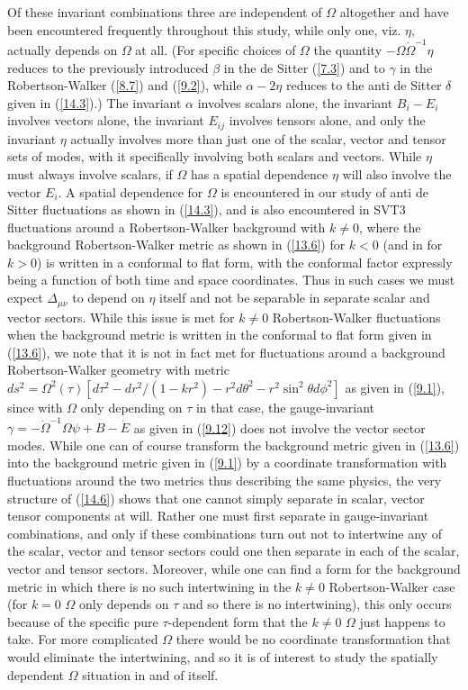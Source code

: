 \documentclass[aps,onecolumn,10pt]{revtex4}
\numberwithin{equation}{section}
\numberwithin{equation}{section}
\begin{document}
Of these invariant combinations three are independent of $\Omega$ altogether and have been encountered frequently throughout this study, while only one, viz. $\eta$, actually depends on $\Omega$ at all. (For specific choices of $\Omega$ the quantity $-\Omega\dot{\Omega}^{-1}\eta$ reduces to the previously introduced $\beta$ in the de Sitter (\ref{7.3}) and to $\gamma$ in the Robertson-Walker (\ref{8.7}) and (\ref{9.2}), while $\alpha-2\eta$ reduces to the anti de Sitter $\delta$ given in (\ref{14.3}).) The invariant $\alpha$ involves scalars alone, the invariant $B_i-E_i$ involves vectors alone, the invariant $E_{ij}$  involves tensors alone, and only the invariant $\eta$ actually involves more than just one of the scalar, vector and tensor sets of modes, with it specifically involving both scalars and vectors. While $\eta$ must always involve scalars, if $\Omega$ has a spatial dependence $\eta$ will also involve the vector $E_i$. A spatial dependence for $\Omega$ is  encountered in our study of anti de Sitter fluctuations as shown in (\ref{14.3}), and is also encountered in SVT3 fluctuations around a Robertson-Walker background with $k\neq 0$,  where the background Robertson-Walker metric as shown in (\ref{13.6}) for $k<0$ (and in \cite{Amarasinghe2018} for $k>0$) is written in a conformal to flat form, with the conformal factor expressly being a function of both time and space coordinates. Thus in such cases we must expect $\Delta_{\mu\nu}$ to depend on $\eta$ itself and not be separable in separate scalar and vector sectors. While this issue is met for $k\neq 0$ Robertson-Walker fluctuations when the background metric is written in the conformal to flat form given in (\ref{13.6}), we note that it is not in fact met for fluctuations around a background Robertson-Walker geometry with metric $ds^2=\Omega^2(\tau)[d\tau^2-dr^2/(1-kr^2)-r^2d\theta^2-r^2\sin^2\theta d\phi^2]$ as given in (\ref{9.1}), since with $\Omega$ only depending on $\tau$ in that case, the gauge-invariant $\gamma = - \dot\Omega^{-1}\Omega \psi + B - \dot E$ as given in (\ref{9.12}) does not involve the vector sector modes. While one can of course transform the background metric given in (\ref{13.6}) into the background metric given in (\ref{9.1}) by a coordinate transformation with fluctuations around the two metrics thus describing the same physics, the very structure of (\ref{14.6}) shows that one cannot simply separate in scalar, vector tensor components at will. Rather one must first separate in gauge-invariant combinations, and only if these combinations turn out not to intertwine any of the scalar, vector and tensor sectors could one then separate in each of the scalar, vector and tensor sectors. Moreover, while one can find a form for the background metric in which there is no such intertwining in the $k\neq 0$ Robertson-Walker case (for $k=0$ $\Omega$ only depends on $\tau$ and so there is no intertwining), this only occurs because of the specific pure $\tau$-dependent form that  the $k\neq 0$ $\Omega$ just happens to take.  For more complicated $\Omega$ there would be no coordinate transformation that would eliminate the intertwining, and so it is of interest to study the spatially dependent $\Omega$ situation in and of itself.
\end{document}
